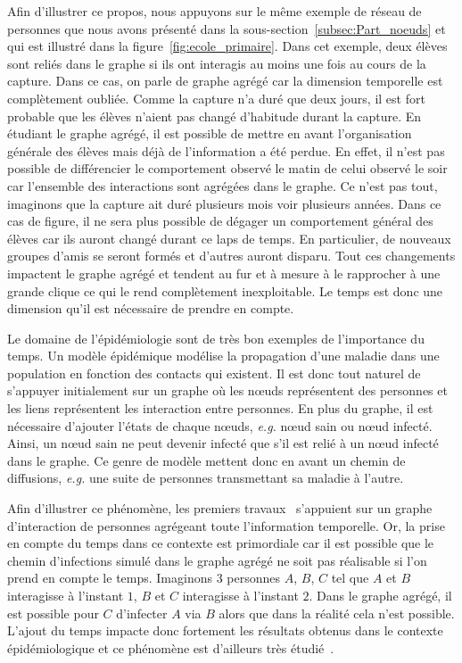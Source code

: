 Afin d'illustrer ce propos, nous appuyons sur le même exemple de réseau de personnes que nous avons présenté dans la sous-section~\ref{subsec:Part_noeuds} et qui est illustré dans la figure~\ref{fig:ecole_primaire}.
Dans cet exemple, deux élèves sont reliés dans le graphe si ils ont interagis au moins une fois au cours de la capture.
Dans ce cas, on parle de graphe agrégé car la dimension temporelle est complètement oubliée.
Comme la capture n'a duré que deux jours, il est fort probable que les élèves n'aient pas changé d'habitude durant la capture.
En étudiant le graphe agrégé, il est possible de mettre en avant l'organisation générale des élèves mais déjà de l'information a été perdue.
En effet, il n'est pas possible de différencier le comportement observé le matin de celui observé le soir car l'ensemble des interactions sont agrégées dans le graphe.
Ce n'est pas tout, imaginons que la capture ait duré plusieurs mois voir plusieurs années.
Dans ce cas de figure, il ne sera plus possible de dégager un comportement général des élèves car ils auront changé durant ce laps de temps.
En particulier, de nouveaux groupes d'amis se seront formés et d'autres auront disparu.
Tout ces changements impactent le graphe agrégé et tendent au fur et à mesure à le rapprocher à une grande clique ce qui le rend complètement inexploitable.
Le temps est donc une dimension qu'il est nécessaire de prendre en compte.

Le domaine de l'épidémiologie sont de très bon exemples de l'importance du temps.
Un modèle épidémique modélise la propagation d'une maladie dans une population en fonction des contacts qui existent.
Il est donc tout naturel de s'appuyer initialement sur un graphe où les n\oe uds représentent des personnes et les liens représentent les interaction entre personnes.
En plus du graphe, il est nécessaire d'ajouter l'états de chaque n\oe uds, \emph{e.g.} n\oe ud sain ou n\oe ud infecté.
Ainsi, un n\oe ud sain ne peut devenir infecté que s'il est relié à un n\oe ud infecté dans le graphe.
Ce genre de modèle mettent donc en avant un chemin de diffusions, \emph{e.g.} une suite de personnes transmettant sa maladie à l'autre.

Afin d'illustrer ce phénomène, les premiers travaux~\cite{Vespignani2008}
s'appuient sur un graphe d'interaction de personnes agrégeant toute l'information temporelle.
Or, la prise en compte du temps dans ce contexte est primordiale car il est possible que le chemin d'infections simulé dans le graphe agrégé ne soit pas réalisable si l'on prend en compte le temps.
Imaginons 3 personnes $A$, $B$, $C$ tel que $A$ et $B$ interagisse à l'instant $1$, $B$ et $C$ interagisse à l'instant $2$.
Dans le graphe agrégé, il est possible pour $C$ d'infecter $A$ via $B$ alors que dans la réalité cela n'est possible.
L'ajout du temps impacte donc fortement les résultats obtenus dans le contexte épidémiologique et ce phénomène est d'ailleurs très étudié~\cite{Gauvin2015,Karsai2011,Jo2014,Horvath2014,Holme2014a,Scholtes2014,Perotti2014}.

